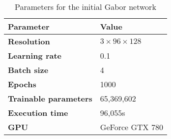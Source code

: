 \begin{table}[h!]
	\footnotesize
	\centering
	\begin{tabular}{ll}
	\hline
		\textbf{Parameter} & \textbf{Value}\\
	\hline
	\hline
		\textbf{Resolution} & $3 \times 96\times128$\\
		\textbf{Learning rate} & 0.1\\
		\textbf{Batch size} & 4\\
		\textbf{Epochs} & 1000\\
		\textbf{Trainable parameters} & 65,369,602\\
		\textbf{Execution time} & 96,055s\\
		\textbf{GPU} & GeForce GTX 780\\
	\hline
	\end{tabular}
	\caption{Parameters for the initial Gabor network}
	\label{tab:params_initial_gabor_network}
\end{table}
